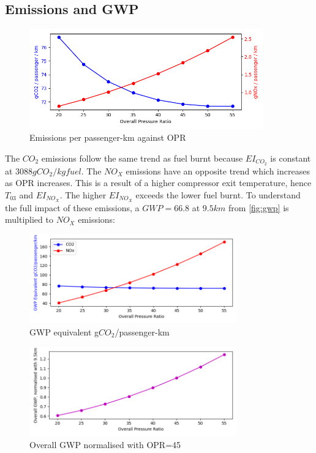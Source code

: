 \documentclass[12pt, a4paper]{article}
\begin{document}
\subsection{Emissions and GWP}
\begin{figure}[H]
	\centering
	\includegraphics[width=0.9\textwidth]{../Plots/opr1}
	\caption{Emissions per passenger-km against OPR}
	\label{fig:o1}
\end{figure}
The $CO_2$ emissions follow the same trend as fuel burnt because $EI_{CO_2}$ is constant at $3088gCO_2/kg fuel$. The $NO_X$ emissions have an opposite trend which increases as OPR increases. This is a result of a higher compressor exit temperature, hence $T_{03}$ and $EI_{NO_X}$. The higher $EI_{NO_X}$ exceeds the lower fuel burnt. To understand the full impact of these emissions, a $GWP=66.8$ at $9.5km$ from \autoref{fig:gwp} is multiplied to $NO_X$ emissions:

\begin{figure}[H]
	\centering
	\includegraphics[width=0.8\textwidth]{../Plots/opr2}
	\caption{GWP equivalent g$CO_2$/passenger-km}
	\label{fig:o2}
\end{figure}
\begin{figure}[H]
	\centering
	\includegraphics[width=0.8\textwidth]{../Plots/opr3}
	\caption{Overall GWP normalised with OPR=45}
	\label{fig:o3}
\end{figure}
\end{document}
